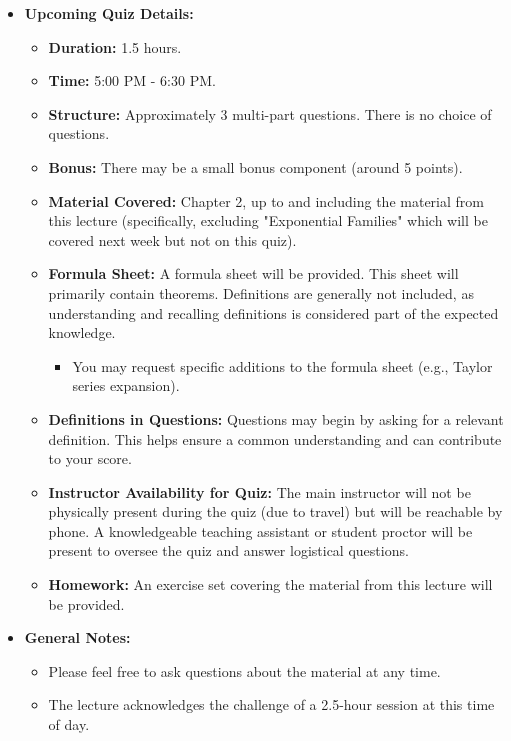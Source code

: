 \documentclass[11pt]{article}
\newcommand{\announcement}[1]{%
    \par\medskip\noindent
    \begingroup %
    \setlength{\fboxsep}{0.8em}%
    \colorbox{yellow!20}{%
        \parbox{0.9\textwidth}{%
            \begin{itemize}[leftmargin=*, itemsep=0.2em, topsep=0.2em] %
            #1
            \end{itemize}%
        }%
    }%
    \endgroup
    \par\medskip
}
\begin{document}
\announcement{%
    \item \textbf{Upcoming Quiz Details:}
    \begin{itemize}[label=\textbullet, itemsep=0.1em, topsep=0.1em]
        \item \textbf{Duration:} 1.5 hours.
        \item \textbf{Time:} 5:00 PM - 6:30 PM.
        \item \textbf{Structure:} Approximately 3 multi-part questions. There is no choice of questions.
        \item \textbf{Bonus:} There may be a small bonus component (around 5 points).
        \item \textbf{Material Covered:} Chapter 2, up to and including the material from this lecture (specifically, excluding "Exponential Families" which will be covered next week but not on this quiz).
        \item \textbf{Formula Sheet:} A formula sheet will be provided. This sheet will primarily contain theorems. Definitions are generally not included, as understanding and recalling definitions is considered part of the expected knowledge.
        \begin{itemize}[label=\textendash]
            \item You may request specific additions to the formula sheet (e.g., Taylor series expansion).
        \end{itemize}
        \item \textbf{Definitions in Questions:} Questions may begin by asking for a relevant definition. This helps ensure a common understanding and can contribute to your score.
        \item \textbf{Instructor Availability for Quiz:} The main instructor will not be physically present during the quiz (due to travel) but will be reachable by phone. A knowledgeable teaching assistant or student proctor will be present to oversee the quiz and answer logistical questions.
        \item \textbf{Homework:} An exercise set covering the material from this lecture will be provided.
    \end{itemize}
    \item \textbf{General Notes:}
    \begin{itemize}[label=\textbullet, itemsep=0.1em, topsep=0.1em]
        \item Please feel free to ask questions about the material at any time.
        \item The lecture acknowledges the challenge of a 2.5-hour session at this time of day.
    \end{itemize}
}
\end{document}
